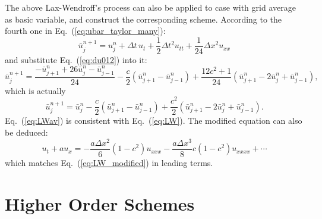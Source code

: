 \documentclass[]{article}
\begin{document}
The above Lax-Wendroff's process can also be applied to case with grid
average as basic variable, and construct the corresponding scheme.
According to the fourth one in Eq.~(\ref{eq:ubar_taylor_many}):
\[
    \bar u_{j}^{n+1}  = u_j^n+\Delta t\, u_t + \frac{1}{2}\Delta t^2
    u_{tt} + \frac{1}{24} \Delta x^2 u_{xx}
\]
and substitute Eq.~(\ref{eq:du012}) into it:
\[
    \bar u_j^{n+1}  = \frac{-\bar u_{j+1}^n + 26\bar u_j^n - \bar u_{j-1}^n}{24}-
    \frac{c}{2}\left(\bar u_{j+1}^n-\bar u_{j-1}^n\right) +
    \frac{12c^2+1}{24}\left(\bar u_{j+1}^n-2\bar u_j^n+\bar
    u_{j-1}^n\right),
\]
which is actually
\begin{equation}
    \bar u_j^{n+1} = \bar u_j^n -\frac{c}{2}\left(\bar u_{j+1}^n-\bar u_{j-1}^n\right) +
    \frac{c^2}{2}\left(\bar u_{j+1}^n-2\bar u_j^n+\bar u_{j-1}^n\right).
    \label{eq:LWav}
\end{equation}
Eq.~(\ref{eq:LWav}) is consistent with Eq.~(\ref{eq:LW}). The
modified equation can also be deduced:
\begin{equation*}
    u_t+au_x=-\frac{a\Delta x^2}{6}(1-c^2)u_{xxx} -\frac{a\Delta x^3}{8}c(1-c^2)u_{xxxx}+\cdots
\end{equation*}
which matches Eq.~(\ref{eq:LW_modified}) in leading terms.




\section{Higher Order Schemes}\label{sec:higher-order-schemes}
\end{document}
